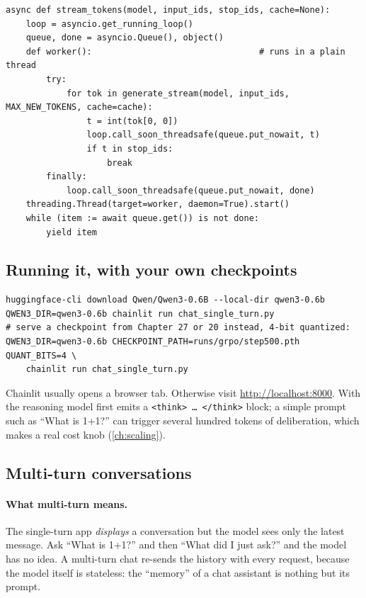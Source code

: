 \begin{lstlisting}[caption={Bridging blocking generation and an async web framework.},
label={lst:efficient:stream}]
async def stream_tokens(model, input_ids, stop_ids, cache=None):
    loop = asyncio.get_running_loop()
    queue, done = asyncio.Queue(), object()
    def worker():                                 # runs in a plain thread
        try:
            for tok in generate_stream(model, input_ids, MAX_NEW_TOKENS, cache=cache):
                t = int(tok[0, 0])
                loop.call_soon_threadsafe(queue.put_nowait, t)
                if t in stop_ids:
                    break
        finally:
            loop.call_soon_threadsafe(queue.put_nowait, done)
    threading.Thread(target=worker, daemon=True).start()
    while (item := await queue.get()) is not done:
        yield item
\end{lstlisting}

\subsection{Running it, with your own checkpoints}
\begin{lstlisting}[style=shell]
huggingface-cli download Qwen/Qwen3-0.6B --local-dir qwen3-0.6b
QWEN3_DIR=qwen3-0.6b chainlit run chat_single_turn.py
# serve a checkpoint from Chapter 27 or 20 instead, 4-bit quantized:
QWEN3_DIR=qwen3-0.6b CHECKPOINT_PATH=runs/grpo/step500.pth QUANT_BITS=4 \
    chainlit run chat_single_turn.py
\end{lstlisting}
Chainlit usually opens a browser tab. Otherwise visit \url{http://localhost:8000}. With
\code{THINKING=1} the reasoning model first emits a \texttt{<think>\,\dots\,</think>}
block; a simple prompt such as ``What is 1+1?'' can trigger several hundred tokens of
deliberation, which makes \code{MAX\_NEW\_TOKENS} a real cost knob
(\cref{ch:scaling}).

\subsection{Multi-turn conversations}
\paragraph{What multi-turn means.} The single-turn app \emph{displays} a conversation but
the model sees only the latest message. Ask ``What is 1+1?'' and then ``What did I just
ask?'' and the model has no idea. A multi-turn chat re-sends the history with every
request, because the model itself is stateless: the ``memory'' of a chat assistant is
nothing but its prompt.

